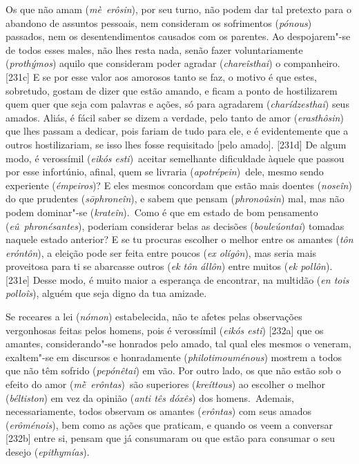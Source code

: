 Os que não amam (\emph{mè}~\emph{erôsin}), por seu turno, não podem dar
tal pretexto para o abandono de assuntos pessoais, nem consideram os
sofrimentos (\emph{pónous}) passados, nem os desentendimentos causados
com os parentes. Ao despojarem"-se de todos esses males, não lhes resta
nada, senão fazer voluntariamente (\emph{prothýmos}) aquilo que
consideram poder agradar (\emph{chareîsthai}) o companheiro. [231c]
E se por esse valor aos amorosos tanto se faz, o motivo é que estes,
sobretudo, gostam de dizer que estão amando, e ficam a ponto de
hostilizarem quem quer que seja com palavras e ações, só para agradarem
(\emph{charídzesthai}) seus amados. Aliás, é fácil saber se dizem a
verdade, pelo tanto de amor (\emph{erasthôsin}) que lhes passam a
dedicar, pois fariam de tudo para ele, e é evidentemente que a outros
hostilizariam, se isso lhes fosse requisitado [pelo amado].
[231d] De algum modo, é verossímil (\emph{eikós esti})~aceitar
semelhante dificuldade àquele que passou por esse infortúnio, afinal,
quem se livraria (\emph{apotrépein})~dele, mesmo sendo experiente
(\emph{émpeiros})? E eles mesmos concordam que estão mais doentes
(\emph{noseîn}) do que prudentes (\emph{sōphroneîn}), e sabem que pensam
(\emph{phronoûsin}) mal, mas não podem dominar"-se (\emph{krateîn}).~Como
é que em estado de bom pensamento (\emph{eû}~\emph{phronésantes}),
poderiam considerar belas as decisões (\emph{bouleúontai}) tomadas
naquele estado anterior? E se tu procuras escolher o melhor entre os
amantes (\emph{tôn eróntôn}), a eleição pode ser feita entre poucos
(\emph{ex olígôn}), mas seria mais proveitosa para ti se abarcasse
outros (\emph{ek tôn állôn}) entre muitos (\emph{ek pollôn}). [231e]
Desse modo, é muito maior a esperança de encontrar, na multidão
(\emph{en tois polloîs}), alguém que seja digno da tua amizade.

Se receares a lei (\emph{nómon}) estabelecida, não te afetes pelas
observações vergonhosas feitas pelos homens, pois é verossímil
(\emph{eikós esti}) [232a] que os amantes, considerando"-se honrados
pelo amado, tal qual eles mesmos o veneram, exaltem"-se em discursos e
honradamente (\emph{philotimouménous}) mostrem a todos que não têm
sofrido (\emph{pepónêtai}) em vão. Por outro lado, os que não estão sob
o efeito do amor (\emph{mḕ}~\emph{erôntas})~são superiores
(\emph{kreíttous}) ao escolher o melhor (\emph{béltiston}) em vez da
opinião (\emph{anti tês dóxês}) dos homens.~Ademais, necessariamente,
todos observam os amantes (\emph{erôntas}) com seus amados
(\emph{erôménois}), bem como as ações que praticam, e quando os veem a
conversar [232b] entre si, pensam que já consumaram ou que estão
para consumar o seu desejo (\emph{epithymías}).

